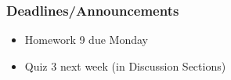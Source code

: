 
\begin{frame}
    \frametitle{Deadlines/Announcements}
\begin{itemize}
            \item Homework 9 due Monday
            \item Quiz 3 next week (in Discussion Sections)
        \end{itemize}
\end{frame}
